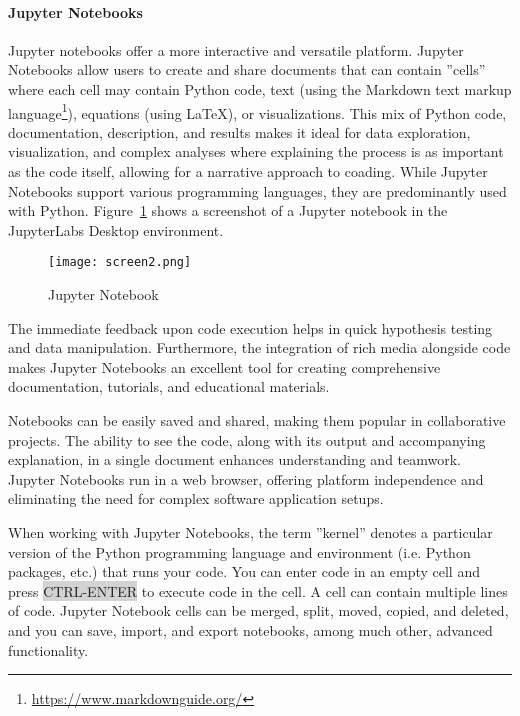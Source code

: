 \paragraph*{Jupyter Notebooks} Jupyter notebooks offer a more interactive and versatile platform. Jupyter Notebooks allow users to create and share documents that can contain ''cells'' where each cell may contain Python code, text (using the Markdown text markup language\footnote{\url{https://www.markdownguide.org/}}), equations (using LaTeX), or visualizations. This mix of Python code, documentation, description, and results makes it ideal for data exploration, visualization, and complex analyses where explaining the process is as important as the code itself, allowing for a narrative approach to coading. While Jupyter Notebooks support various programming languages, they are predominantly used with Python. Figure~\ref{fig:jupyter} shows a screenshot of a Jupyter notebook in the JupyterLabs Desktop environment.

\begin{figure}
\centering
\texttt{[image: screen2.png]}
\caption{Jupyter Notebook}
\label{fig:jupyter}
\end{figure}

The immediate feedback upon code execution helps in quick hypothesis testing and data manipulation. Furthermore, the integration of rich media alongside code makes Jupyter Notebooks an excellent tool for creating comprehensive documentation, tutorials, and educational materials.

Notebooks can be easily saved and shared, making them popular in collaborative projects. The ability to see the code, along with its output and accompanying explanation, in a single document enhances understanding and teamwork. Jupyter Notebooks run in a web browser, offering platform independence and eliminating the need for complex software application setups.

When working with Jupyter Notebooks, the term ''kernel'' denotes a particular version of the Python programming language and environment (i.e. Python packages, etc.) that runs your code. You can enter code in an empty cell and press {\footnotesize\colorbox{lightgray}{CTRL-ENTER}} to execute code in the cell. A cell can contain multiple lines of code. Jupyter Notebook cells can be merged, split, moved, copied, and deleted, and you can save, import, and export notebooks, among much other, advanced functionality.

